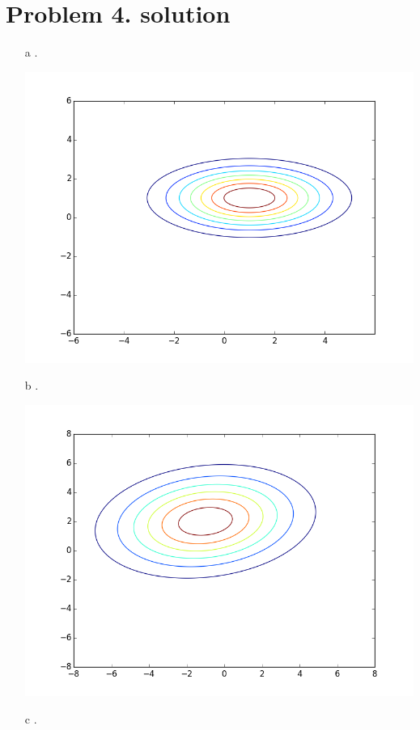 \documentclass[11pt]{article}
\begin{document}
\newpage
\section*{Problem 4. solution}

\begin{itemize}
\item[a].

\includegraphics[scale=0.55]{q41}

\item[b].

\includegraphics[scale=0.55]{q42}

\item[c].


\end{itemize}
\end{document}
